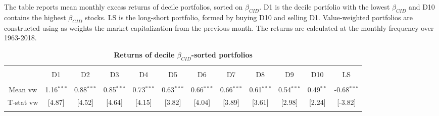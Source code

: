 \documentclass[12pt]{article}
\begin{document}
\begin{table}[!htbp]
\end{table}




\begin{table}[!htbp] \centering 
  \caption{\textbf{Returns of decile $\beta_{CID}$-sorted portfolios}} 
  \label{} 
  \begin{flushleft}
    {\medskip\small
 The table reports mean monthly excess returns of decile portfolios, sorted on $\beta_{CID}$. D1 is the decile portfolio with the lowest $\beta_{CID}$ and D10 contains the highest $\beta_{CID}$ stocks. LS is the long-short portfolio, formed by buying D10 and selling D1. Value-weighted portfolios are constructed using as weights the market capitalization from the previous month. The returns are calculated at the monthly frequency over 1963-2018.}
    \medskip
    \end{flushleft}
\begin{tabular}{@{\extracolsep{-5pt}} cccccccccccc} 
\\[-1.8ex]\hline 
\hline \\[-1.8ex] 
 & D1 & D2 & D3 & D4 & D5 & D6 & D7 & D8 & D9 & D10 & LS \\ 
\hline \\[-1.8ex] 
Mean vw & 1.16$^{***}$ & 0.88$^{***}$ & 0.85$^{***}$ & 0.73$^{***}$ & 0.63$^{***}$ & 0.66$^{***}$ & 0.66$^{***}$ & 0.61$^{***}$ & 0.54$^{***}$ & 0.49$^{**}$ & -0.68$^{***}$ \\ 
T-stat vw & [4.87] & [4.52] & [4.64] & [4.15] & [3.82] & [4.04] & [3.89] & [3.61] & [2.98] & [2.24] & [-3.82] \\ 
\hline \\[-1.8ex] 
\end{tabular} 
\end{table}
\end{document}
